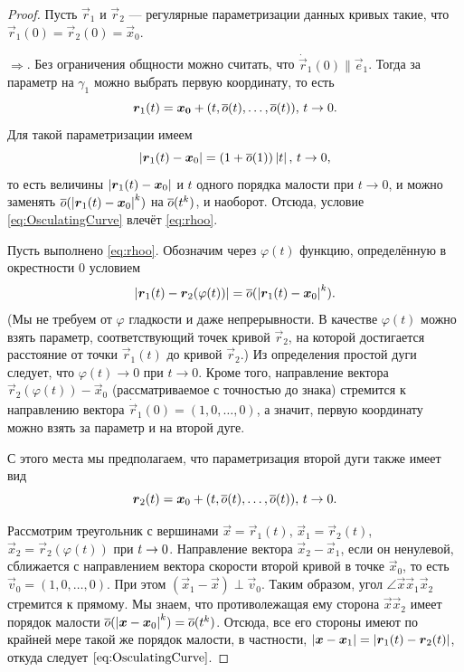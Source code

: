 \begin{proof}
	Пусть $\vec{r}_1$ и $\vec{r}_2$ --- регулярные параметризации данных кривых такие, что $\vec{r}_1(0) = \vec{r}_2(0) = \vec{x}_0$.

	$\Rightarrow$. Без ограничения общности можно считать, что $\dot{\vec{r}}_1(0) \parallel \vec{e}_1$. Тогда за параметр на $\gamma_1$ можно выбрать первую координату, то есть
	\[
		\boldsymbol{r}_1(t) = \boldsymbol{x_0} + (t, \overline{o}(t), \ldots, \overline{o}(t)),\,t \to 0.
	\]
	Для такой параметризации имеем
	\[
		\left\lvert\boldsymbol{r}_1(t) - \boldsymbol{x}_0\right\rvert = (1 + \overline{o}(1))\left\lvert t\right\rvert,\,t \to 0,
	\]
	то есть величины $\left\lvert\boldsymbol{r}_1(t) - \boldsymbol{x}_0\right\rvert$ и $t$ одного порядка малости при $t \to 0$, и можно заменять $\overline{o}(\left\lvert\boldsymbol{r}_1(t) - \boldsymbol{x}_0\right\rvert^k)$ на $\overline{o}(t^k)$, и наоборот. Отсюда, условие \eqref{eq:OsculatingCurve} влечёт \eqref{eq:rhoo}.

	Пусть выполнено \eqref{eq:rhoo}. Обозначим через $\varphi(t)$ функцию, определённую в окрестности $0$ условием
	\[
		\left\lvert\boldsymbol{r}_1(t) - \boldsymbol{r}_2(\varphi(t))\right\rvert = \overline{o}(\left\lvert\boldsymbol{r}_1(t) - \boldsymbol{x}_0\right\rvert^k).
	\]
	(Мы не требуем от $\varphi$ гладкости и даже непрерывности. В качестве $\varphi(t)$ можно взять параметр, соответствующий точек кривой $\vec{r}_2$, на которой достигается расстояние от точки $\vec{r}_1(t)$ до кривой $\vec{r}_2$.) Из определения простой дуги следует, что $\varphi(t) \to 0$ при $t \to 0$. Кроме того, направление вектора $\vec{r}_2(\varphi(t)) - \vec{x}_0$ (рассматриваемое с точностью до знака) стремится к направлению вектора $\dot{\vec{r}}_1(0) = (1, 0, \ldots, 0)$, а значит, первую координату можно взять за параметр и на второй дуге.

	С этого места мы предполагаем, что параметризация второй дуги также имеет вид
	\[
		\boldsymbol{r}_2(t) = \boldsymbol{x}_0 + (t, \overline{o}(t), \ldots, \overline{o}(t)),\,t \to 0.
	\]

	Рассмотрим треугольник с вершинами $\vec{x} = \vec{r}_1(t)$, $\vec{x}_1 = \vec{r}_2(t)$, $\vec{x}_2 = \vec{r}_2(\varphi(t))$ при $t \hm\to 0$. Направление вектора $\vec{x}_2 - \vec{x}_1$, если он ненулевой, сближается с направлением вектора скорости второй кривой в точке $\vec{x}_0$, то есть $\vec{v}_0 = (1, 0, \ldots, 0)$. При этом $(\vec{x}_1 - \vec{x}) \perp \vec{v}_0$. Таким образом, угол $\angle \vec{x}\vec{x}_1\vec{x}_2$ стремится к прямому. Мы знаем, что противолежащая ему сторона $\vec{x}\vec{x}_2$ имеет порядок малости $\overline{o}(\left\lvert\boldsymbol{x} - \boldsymbol{x}_0\right\rvert^k) = \overline{o}(t^k)$. Отсюда, все его стороны имеют по крайней мере такой же порядок малости, в частности, $\left\lvert\boldsymbol{x} - \boldsymbol{x}_1\right\rvert = \left\lvert\boldsymbol{r}_1(t) - \boldsymbol{r}_2(t)\right\rvert$, откуда следует $\eqref{eq:OsculatingCurve}$.
\end{proof} %

